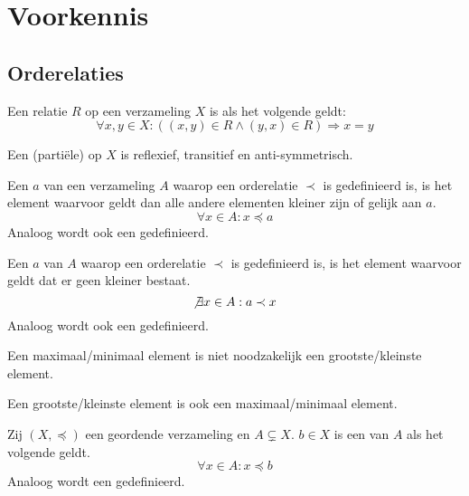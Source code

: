 \documentclass[main.tex]{subfiles}
\begin{document}
\chapter{Voorkennis}
\label{cha:voorkennis}

\section{Orderelaties}
\label{sec:orderelaties}


\begin{de}
  Een relatie $R$ op een verzameling $X$ is  als het volgende geldt:
  \[ \forall x,y \in X: ((x,y) \in R \wedge (y,x) \in R) \Rightarrow x = y \]
\end{de}

\begin{de}
  Een (parti\"ele)  op $X$ is reflexief, transitief en anti-symmetrisch.
\end{de}

\begin{de}
  Een  $a$ van een verzameling $A$ waarop een orderelatie $\prec$ is gedefinieerd is, is het element waarvoor geldt dan alle andere elementen kleiner zijn of gelijk aan $a$.
  \[ \forall x \in A: x \preceq a \] 
  Analoog wordt ook een  gedefinieerd.
\end{de}

\begin{de}
  Een  $a$ van $A$ waarop een orderelatie $\prec$ is gedefinieerd is, is het element waarvoor geldt dat er geen kleiner bestaat.
  \[ \not\exists x \in A: a \prec x \]
  Analoog wordt ook een  gedefinieerd.
\end{de}

\begin{opm}
  Een maximaal/minimaal element is niet noodzakelijk een grootste/kleinste element.    
\end{opm}

\begin{st}
  Een grootste/kleinste element is ook een maximaal/minimaal element.
\end{st}

\begin{de}
  Zij $(X,\preceq)$ een geordende verzameling en $A \subsetneq X$.
  $b \in X$ is een  van $A$ als het volgende geldt.
  \[ \forall x \in A: x \preceq b \]
  Analoog wordt een  gedefinieerd.
\end{de}
\end{document}
